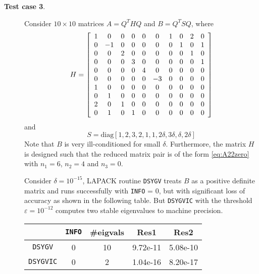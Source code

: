 \documentclass[11pt]{article}
\begin{document}
\begin{description}
\item[{\bf Test case 3}.] Consider $10 \times 10$ matrices
$A=Q^TH Q$ and $B = Q^TSQ$, where 
\[
H=\left[\begin{array}{c c c c c c c c c c}
1 & 0 & 0 & 0 & 0 & 0 & 1 & 0 & 2 & 0 \\
0 &-1 & 0 & 0 & 0 & 0 & 0 & 1 & 0 & 1 \\
0 & 0 & 2 & 0 & 0 & 0 & 0 & 0 & 1 & 0 \\
0 & 0 & 0 & 3 & 0 & 0 & 0 & 0 & 0 & 1 \\
0 & 0 & 0 & 0 & 4 & 0 & 0 & 0 & 0 & 0 \\
0 & 0 & 0 & 0 & 0 &-3 & 0 & 0 & 0 & 0 \\
1 & 0 & 0 & 0 & 0 & 0 & 0 & 0 & 0 & 0 \\
0 & 1 & 0 & 0 & 0 & 0 & 0 & 0 & 0 & 0 \\
2 & 0 & 1 & 0 & 0 & 0 & 0 & 0 & 0 & 0 \\
0 & 1 & 0 & 1 & 0 & 0 & 0 & 0 & 0 & 0
\end{array}\right]
\]
and 
\[
S=\mbox{diag}[1,2,3,2,1,1,2\delta,3\delta,\delta,2\delta]
\]
Note that $B$ is very ill-conditioned for small $\delta$. 
Furthermore,
the matrix $H$ is designed such that the reduced matrix pair
is of the form \eqref{eq:A22zero} with $n_1=6$, $n_2=4$ and $n_3=0$.

Consider $\delta=10^{-15}$,
LAPACK routine {\tt DSYGV} treats $B$ as a positive definite matrix
and runs successfully with {\tt INFO} = 0, but with significant loss
of accuracy as shown in the following table. 
But {\tt DSYGVIC} with the threshold $\varepsilon=10^{-12}$ 
computes two stable eigenvalues to machine precision.
\begin{center}
\begin{tabular}{ c || c | c | c | c   }
    		& {\tt INFO} & \#eigvals & Res1      & Res2     \\ \hline
    {\tt DSYGV}   &  0   &   10      & 9.72e-11  & 5.08e-10 \\
    {\tt DSYGVIC} &  0   &   2       & 1.04e-16  & 8.20e-17 \\ 
\end{tabular}
\end{center}


\end{description}
\end{document}
